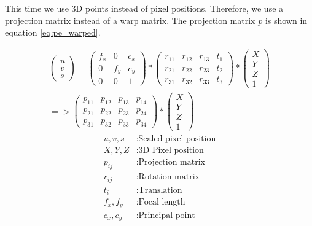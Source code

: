 \documentclass[11pt,a4paper,titlepage,oneside]{report}
\begin{document}
This time we use 3D points instead of pixel positions. Therefore, we use a projection matrix instead of a warp matrix. The projection matrix $p$ is shown in equation \ref{eq:pe_warped}. 

\begin{equation}\label{eq:pe_warped}
  \begin{split}
  \begin{pmatrix}
    u \\
    v \\
    s
  \end{pmatrix}=
  \begin{pmatrix}
    f_x & 0 & c_x \\
    0 & f_y & c_y \\
    0 & 0 & 1
  \end{pmatrix}*
  \begin{pmatrix}
    r_{11} & r_{12} & r_{13} & t_{1} \\
    r_{21} & r_{22} & r_{23} & t_{2} \\
    r_{31} & r_{32} & r_{33} & t_{3}
  \end{pmatrix}*
  \begin{pmatrix}
    X\\
    Y\\
    Z\\
    1
  \end{pmatrix}\\
  =>\begin{pmatrix}
    p_{11} & p_{12} & p_{13} & p_{14} \\
    p_{21} & p_{22} & p_{23} & p_{24} \\
    p_{31} & p_{32} & p_{33} & p_{34}
  \end{pmatrix}*
  \begin{pmatrix}
    X\\
    Y\\
    Z\\
    1
  \end{pmatrix}
\end{split}
\end{equation}
\begin{align*}
  u,v,s     &: \text{Scaled pixel position}\\
  X,Y,Z     &: \text{3D Pixel position}\\
  p_{ij}		&: \text{Projection matrix}\\
  r_{ij}		&: \text{Rotation matrix}\\
  t_{i}		  &: \text{Translation}\\
	f_x,f_y		&: \text{Focal length}\\
	c_x,c_y		&: \text{Principal point}
\end{align*}
\end{document}
